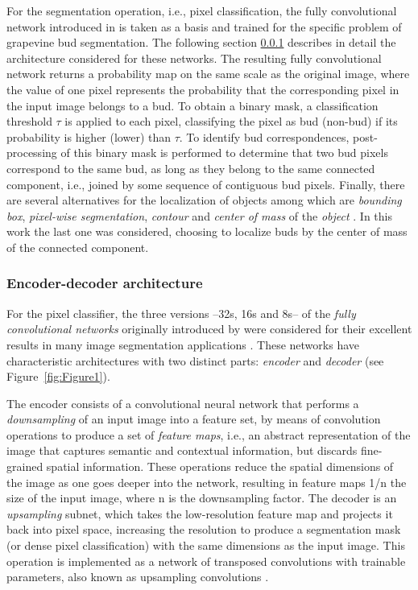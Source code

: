 \documentclass[a4paper,authoryear,review]{elsarticle}
\begin{document}
	For the segmentation operation, i.e., pixel classification, the fully convolutional network introduced in \citep{long2015fully} is taken as a basis and trained for the specific problem of grapevine bud segmentation. The following section  \ref{sec:fcnmn} describes in detail the architecture considered for these networks. The resulting fully convolutional network returns a probability map on the same scale as the original image, where the value of one pixel represents the probability that the corresponding pixel in the input image belongs to a bud. To obtain a binary mask, a classification threshold $\tau$ is applied to each pixel, classifying the pixel as bud (non-bud) if its probability is higher (lower) than $\tau$. To identify bud correspondences, post-processing of this binary mask is performed to determine that two bud pixels correspond to the same bud, as long as they belong to the same connected component, i.e., joined by some sequence of contiguous bud pixels. 
	Finally, there are several alternatives for the localization of objects among which are \emph{bounding box}, \emph{pixel-wise segmentation}, \emph{contour} and \emph{center of mass} of the \emph{object} \citep{lampert2008beyond}. In this work the last one was considered, choosing to localize buds by the center of mass of the connected component. 
	
	\subsubsection {Encoder-decoder architecture}
	\label{sec:fcnmn}
	
	For the pixel classifier, the three versions --32s, 16s and 8s--  of the \emph{fully convolutional networks} originally introduced by \citet{long2015fully} were considered for their excellent results in many image segmentation applications \citep{litjens2017survey, garcia2018survey, kaymak2019brief}. These networks have characteristic architectures with two distinct parts: \emph{encoder} and \emph{decoder} (see Figure~\ref{fig:Figure1}). 
	
	The encoder consists of a convolutional neural network that performs a \emph{downsampling} of an input image into a feature set, by means of convolution operations to produce a set of \emph{feature maps}, i.e., an abstract representation of the image that captures semantic and contextual information, but discards fine-grained spatial information. These operations reduce the spatial dimensions of the image as one goes deeper into the network, resulting in feature maps 1/n the size of the input image, where n is the downsampling factor. The decoder is an \emph{upsampling} subnet, which takes the low-resolution feature map and projects it back into pixel space, increasing the resolution to produce a segmentation mask (or dense pixel classification) with the same dimensions as the input image. This operation is implemented as a network of transposed convolutions with trainable parameters, also known as upsampling convolutions \citep{shelhamer2017fully}. 
	
\end{document}
